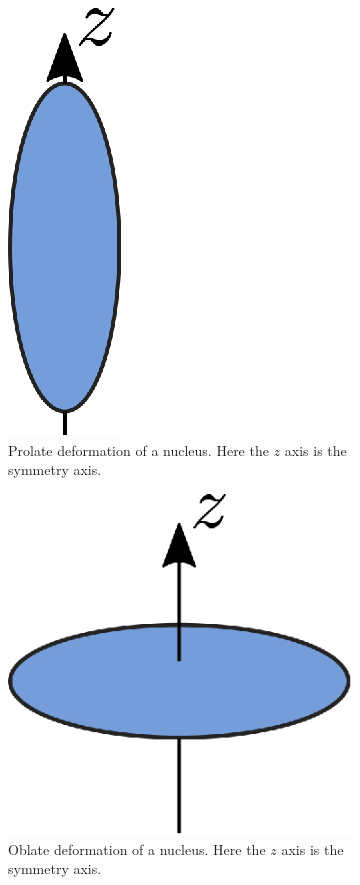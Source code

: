 \documentclass[10pt,a4paper, twoside]{report}
\begin{document}
\begin{figure}
\centering
\begin{subfigure}[b]{0.48\textwidth}
\centering
\includegraphics{./figures/prolate.eps}
\caption{Prolate deformation of a nucleus. Here the $z$ axis is the symmetry axis.}
\end{subfigure}	
\quad
\begin{subfigure}[b]{0.48\textwidth}
\centering
\includegraphics{./figures/oblate.eps}
\caption{Oblate deformation of a nucleus. Here the $z$ axis is the symmetry axis.}
\end{subfigure}
\caption[Quadrupole deformations of nuclei]{ }
\end{figure}
\end{document}
